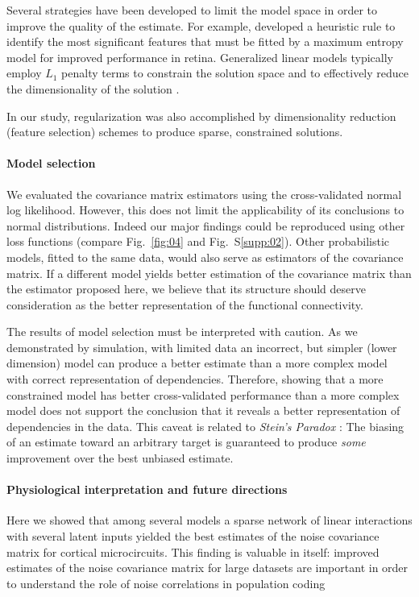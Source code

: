 \documentclass[10pt]{article}
\begin{document}
Several strategies have been developed to limit the model space in order to improve the quality of the estimate. For example, \cite{Ganmor:2011} developed a heuristic rule to identify the most significant features that must be fitted by a maximum entropy model for improved performance in retina. Generalized linear models typically employ $L_1$ penalty terms to constrain the solution space and to effectively reduce the dimensionality of the solution \cite{Pillow:2008}.  

In our study, regularization was also accomplished by dimensionality reduction (feature selection) schemes to produce sparse, constrained solutions.


\paragraph{Model selection}
We evaluated the covariance matrix estimators using the cross-validated normal log likelihood.  However, this does not limit the applicability of its conclusions to normal distributions. Indeed our major findings could be reproduced using other loss functions (compare Fig.~\ref{fig:04} and Fig.~S\ref{supp:02}).  Other probabilistic models, fitted to the same data, would also serve as estimators of the covariance matrix.  If a different model yields better estimation of the covariance matrix than the estimator proposed here, we believe that its structure should deserve consideration as the better representation of the functional connectivity.

The results of model selection must be interpreted with caution.  As we demonstrated by simulation, with limited data an incorrect, but simpler (lower dimension) model can produce a better estimate than a more complex model with correct representation of dependencies.   Therefore, showing that a more constrained model has better cross-validated performance than a more complex model does not support the conclusion that it reveals a better representation of dependencies in the data.  This caveat is related to \emph{Stein's Paradox} \cite{Efron:1977}: The biasing of an estimate toward an arbitrary target is guaranteed to produce \emph{some} improvement over the best unbiased estimate.

\paragraph{Physiological interpretation and future directions}

Here we showed that among several models a sparse network of linear interactions with several latent inputs yielded the best estimates of the noise covariance matrix for cortical microcircuits.  This finding is valuable in itself: improved estimates of the noise covariance matrix for large datasets are important in order to understand the role of noise correlations in population coding \cite{Abbott:1999, Sompolinsky:2001, Averbeck:2006, Ecker:2011}  
\end{document}
